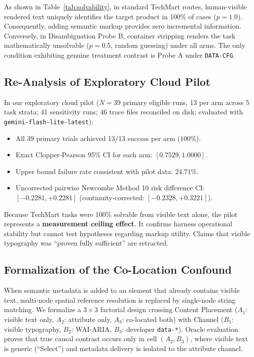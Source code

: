 \documentclass[conference]{IEEEtran}
\begin{document}
As shown in Table~\ref{tab:solvability}, in standard TechMart routes, human-visible rendered text uniquely identifies the target product in 100\% of cases ($p=1.0$). Consequently, adding semantic markup provides zero incremental information. Conversely, in Disambiguation Probe B, container stripping renders the task mathematically unsolvable ($p=0.5$, random guessing) under all arms. The only condition exhibiting genuine treatment contrast is Probe A under \texttt{DATA-CFG}.

\subsection{Re-Analysis of Exploratory Cloud Pilot}
In our exploratory cloud pilot ($N=39$ primary eligible runs, 13 per arm across 5 task strata; 41 sensitivity runs; 46 trace files reconciled on disk; evaluated with \texttt{gemini-flash-lite-latest}):
\begin{itemize}
    \item All 39 primary trials achieved 13/13 success per arm ($100\%$).
    \item Exact Clopper-Pearson 95\% CI for each arm: $[\mathbf{0.7529}, \mathbf{1.0000}]$.
    \item Upper bound failure rate consistent with pilot data: $\mathbf{24.71\%}$.
    \item Uncorrected pairwise Newcombe Method 10 risk difference CI: $[-\mathbf{0.2281}, +\mathbf{0.2281}]$ (continuity-corrected: $[-\mathbf{0.2328}, +\mathbf{0.3221}]$).
\end{itemize}
Because TechMart tasks were 100\% solvable from visible text alone, the pilot represents a \textbf{measurement ceiling effect}. It confirms harness operational stability but cannot test hypotheses regarding markup utility. Claims that visible typography was ``proven fully sufficient'' are retracted.

\subsection{Formalization of the Co-Location Confound}
When semantic metadata is added to an element that already contains visible text, multi-node spatial reference resolution is replaced by single-node string matching. We formalize a $3 \times 3$ factorial design crossing Content Placement ($A_1$: visible text only, $A_2$: attribute only, $A_3$: co-located both) with Channel ($B_1$: visible typography, $B_2$: WAI-ARIA, $B_3$: developer \texttt{data-*}). Oracle evaluation proves that true causal contrast occurs only in cell $(A_2, B_3)$, where visible text is generic (``Select'') and metadata delivery is isolated to the attribute channel.
\end{document}
